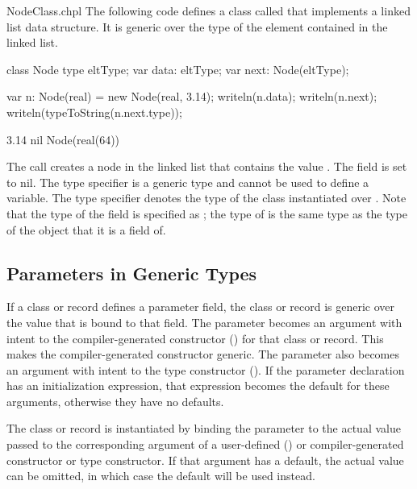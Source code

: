 \begin{chapelexample}{NodeClass.chpl}
The following code defines a class called  that implements
a linked list data structure.  It is generic over the type of the
element contained in the linked list.
\begin{chapel}
class Node {
  type eltType;
  var data: eltType;
  var next: Node(eltType);
}
\end{chapel}
\begin{chapelpost}
var n: Node(real) = new Node(real, 3.14);
writeln(n.data);
writeln(n.next);
writeln(typeToString(n.next.type));
\end{chapelpost}
\begin{chapeloutput}
3.14
nil
Node(real(64))
\end{chapeloutput}
The call  creates a node in the linked list
that contains the value .  The  field is set to
nil.  The type specifier  is a generic type and cannot be
used to define a variable.  The type specifier 
denotes the type of the  class instantiated over
.  Note that the type of the  field is specified
as ; the type of  is the same type as
the type of the object that it is a field of.
\end{chapelexample}

\subsection{Parameters in Generic Types}
\label{Parameters_in_Generic_Types}

If a class or record defines a parameter field, the class or record
is generic over the value that is bound to that field.
The parameter becomes an argument with intent  to the
compiler-generated constructor ()
for that class or record.  This makes the compiler-generated
constructor generic.  The parameter also becomes an argument
with intent  to the type  constructor ().
If the parameter declaration has an initialization expression, that expression
becomes the default for these arguments, otherwise they have no defaults.

The class or record is instantiated by binding the parameter
to the actual value passed to the corresponding argument of
a user-defined ()
or compiler-generated constructor or type constructor.
If that argument has a default, the actual value can be omitted, in
which case the default will be used instead.

